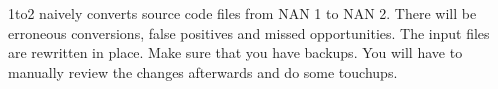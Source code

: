 1to2 naively converts source code files from N\+AN 1 to N\+AN 2. There will be erroneous conversions, false positives and missed opportunities. The input files are rewritten in place. Make sure that you have backups. You will have to manually review the changes afterwards and do some touchups.


 
